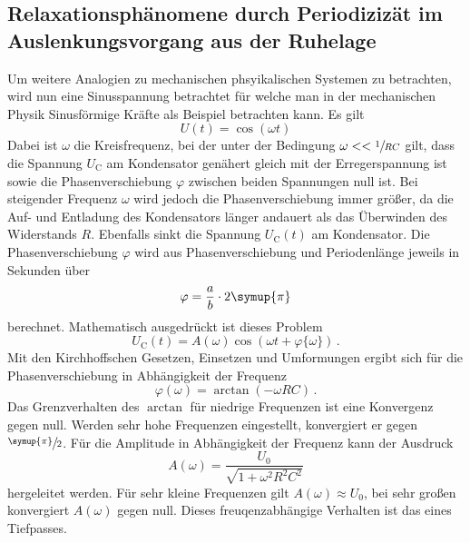 \subsection{Relaxationsphänomene durch Periodizizät im Auslenkungsvorgang 
aus der Ruhelage}
Um weitere Analogien zu mechanischen phsyikalischen Systemen zu betrachten,
wird nun eine Sinusspannung betrachtet für welche man in der mechanischen 
Physik Sinusförmige Kräfte als Beispiel betrachten kann. Es gilt
\begin{equation*}
    U(t)=\cos(\omega t)
\end{equation*}
Dabei ist $\omega$ die Kreisfrequenz, bei der unter der Bedingung $\omega<<\sfrac{1}{RC}$
gilt, dass die Spannung $U_\text{C}$ am Kondensator genähert gleich mit der Erregerspannung ist
sowie die Phasenverschiebung $\varphi$ zwischen beiden Spannungen null ist.
Bei steigender Frequenz $\omega$ wird jedoch die Phasenverschiebung immer größer,
da die Auf- und Entladung des Kondensators länger andauert als das Überwinden des
Widerstands $R$. Ebenfalls sinkt die Spannung $U_\text{C}(t)$ am Kondensator.
Die Phasenverschiebung $\varphi$ wird aus Phasenverschiebung und Periodenlänge
jeweils in Sekunden über 
\begin{equation}
    \varphi=\frac{a}{b}\cdot2\symup{\pi}
    \label{eq:Phasenverschiebung}
\end{equation}
berechnet. Mathematisch ausgedrückt ist dieses Problem 
\begin{equation*}
    U_\text{C}(t)=A(\omega)\cos(\omega t+\varphi\{\omega\})\,.
\end{equation*}
Mit den Kirchhoffschen Gesetzen, Einsetzen und Umformungen ergibt sich für die Phasenverschiebung
in Abhängigkeit der Frequenz
\begin{equation}
    \varphi(\omega)=\arctan(-\omega RC)\,.
    \label{eq:arctan1}
\end{equation}
Das Grenzverhalten des $\arctan$ für niedrige Frequenzen ist eine Konvergenz gegen null.
Werden sehr hohe Frequenzen eingestellt, konvergiert er gegen $\sfrac{\symup{\pi}}{2}$.
Für die Amplitude in Abhängigkeit der Frequenz kann der Ausdruck
\begin{equation}
    A(\omega)=\frac{U_0}{\sqrt{1+\omega^2R^2C^2}}
    \label{eq:arctan}
\end{equation}
hergeleitet werden. Für sehr kleine Frequenzen gilt $A(\omega)\approx U_0$, bei sehr großen
konvergiert $A(\omega)$ gegen null. Dieses freuqenzabhängige Verhalten ist das eines
Tiefpasses.
